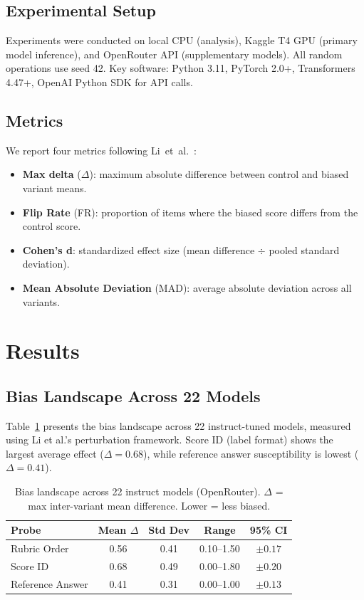 \documentclass[11pt,preprint,nonatbib]{article}
\begin{document}
\subsection{Experimental Setup}
Experiments were conducted on local CPU (analysis), Kaggle T4 GPU (primary model inference), and OpenRouter API (supplementary models). All random operations use seed 42. Key software: Python 3.11, PyTorch 2.0+, Transformers 4.47+, OpenAI Python SDK for API calls.

\subsection{Metrics}
We report four metrics following Li~et~al.~\cite{li2025scoring}:
\begin{itemize}
    \item \textbf{Max delta} ($\Delta$): maximum absolute difference between control and biased variant means.
    \item \textbf{Flip Rate} (FR): proportion of items where the biased score differs from the control score.
    \item \textbf{Cohen's d}: standardized effect size (mean difference $\div$ pooled standard deviation).
    \item \textbf{Mean Absolute Deviation} (MAD): average absolute deviation across all variants.
\end{itemize}

\section{Results}

\subsection{Bias Landscape Across 22 Models}

Table~\ref{tab:main} presents the bias landscape across 22 instruct-tuned models, measured using Li et al.'s perturbation framework. Score ID (label format) shows the largest average effect ($\Delta = 0.68$), while reference answer susceptibility is lowest ($\Delta = 0.41$).

\begin{table}[h]
\centering\small
\caption{Bias landscape across 22 instruct models (OpenRouter). $\Delta$ = max inter-variant mean difference. Lower = less biased.}
\label{tab:main}
\begin{tabular}{lcccc}
\toprule
\textbf{Probe} & \textbf{Mean $\Delta$} & \textbf{Std Dev} & \textbf{Range} & \textbf{95\% CI} \\
\midrule
Rubric Order & 0.56 & 0.41 & 0.10--1.50 & $\pm 0.17$ \\
Score ID & 0.68 & 0.49 & 0.00--1.80 & $\pm 0.20$ \\
Reference Answer & 0.41 & 0.31 & 0.00--1.00 & $\pm 0.13$ \\
\bottomrule
\end{tabular}
\end{table}
\end{document}
